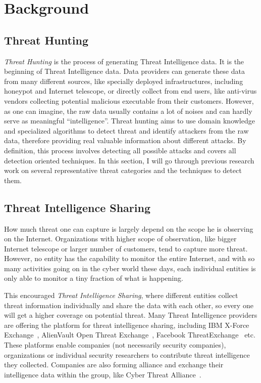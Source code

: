 \chapter{Background}
\label{chapter:background}

\section{Threat Hunting}
\textit{Threat Hunting} is the process of generating Threat Intelligence
data. It is the beginning of Threat Intelligence data. Data providers 
can generate these data from many different sources, like specially
deployed infrastructures, including honeypot and Internet telescope, or
directly collect from end users, like anti-virus vendors collecting 
potential malicious executable from their customers. However, as one can
imagine, the raw data usually contains a lot of noises and can hardly
serve as meaningful ``intelligence''. Threat hunting aims to use domain 
knowledge and specialized algorithms to detect threat and identify
attackers from the raw data, therefore providing real valuable 
information about different attacks. By definition, this process involves
detecting all possible attacks and covers all detection oriented 
techniques. In this section, I will go through previous research work 
on several representative threat categories and the techniques to detect
them.







\section{Threat Intelligence Sharing}
How much threat one can capture is largely depend on the scope he is
observing on the Internet. Organizations with higher scope of observation,
like bigger Internet telescope or larger number of customers, tend to
capture more threat. However, no entity has the capability to monitor
the entire Internet, and with so many activities going on in the cyber
world these days, each individual entities is only able to monitor a
tiny fraction of what is happening. 

This encouraged \textit{Threat Intelligence Sharing}, where different 
entities collect threat information individually and share the data
with each other, so every one will get a higher coverage on potential 
threat. Many Threat Intelligence providers are offering the platform
for threat intelligence sharing, including IBM X-Force 
Exchange~\cite{ibmxforce}, AlienVault Open Threat 
Exchange~\cite{alienvaultotx}, Facebook 
ThreatExchange~\cite{facebookthreatexchange} etc. These platforms
enable companies (not necessarily security companies), organizations 
or individual security researchers to contribute threat intelligence 
they collected. Companies are also forming alliance and exchange their
intelligence data within the group, like Cyber Threat
Alliance~\cite{cyberthreatalliance}.

